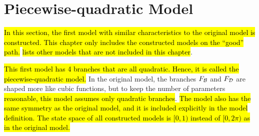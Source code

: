 \section{Piecewise-quadratic Model}
\label{sec:setup.quad}

\hl{
	In this section, the first model with similar characteristics to the original model is constructed.
	This chapter only includes the constructed models on the ``good'' path.
}
 \hl{lists other models that are not included in this chapter}.

\hl{
	This first model has 4 branches that are all quadratic.
	Hence, it is called the piecewise-quadratic model.
}
In the original model, the branches $F_{\mathcal{B}}$ and $F_{\mathcal{D}}$ are shaped more like cubic functions, but to keep the number of parameters \hl{reasonable, this model assumes only quadratic branches}.
\hl{
The model also has the same symmetry as the original model, and it is included explicitly in the model definition.
The state space of all constructed models is $[0, 1)$ instead of $[0, 2\pi)$ as in the original model.
}




